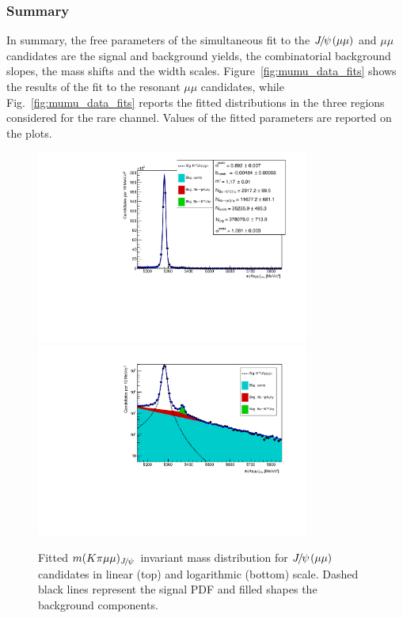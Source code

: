 \subsubsection{Summary}

In summary, the free parameters of the simultaneous fit to the $\jpsi(\mu\mu)$ and 
$\mu\mu$ candidates are the signal and background yields, the combinatorial background 
slopes, the mass shifts and the width scales. Figure~\ref{fig:mumu_data_fits} shows the results 
of the fit to the resonant $\mu\mu$ candidates, while Fig.~\ref{fig:mumu_data_fits} reports the 
fitted distributions in the three \qsq regions considered for the rare channel. 
Values of the fitted parameters are reported on the plots.

\begin{figure}[h!]
\centering
\includegraphics[width=0.8\textwidth]{RKst/figs/Fit/fit_MM/KstJPsMM.pdf}
\includegraphics[width=0.8\textwidth]{RKst/figs/Fit/fit_MM/KstJPsMM_log.pdf}
\caption{Fitted $m(K\pi \mu\mu)_\jpsi$ invariant mass distribution for $\jpsi(\mu\mu)$ candidates
in linear (top) and logarithmic (bottom) scale. Dashed black lines represent the signal 
PDF and filled shapes the background components. }
\label{fig:mumu_data_jpsi_fits}
\end{figure}

